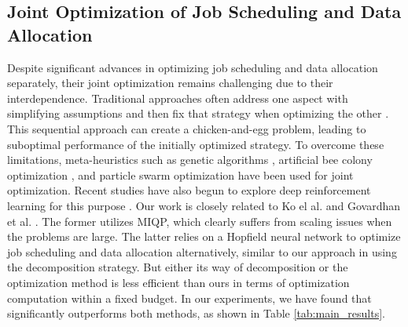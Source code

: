 \subsection{Joint Optimization of Job Scheduling and Data Allocation}
Despite significant advances in optimizing job scheduling and data allocation separately, their joint optimization remains challenging due to their interdependence. Traditional approaches often address one aspect with simplifying assumptions and then fix that strategy when optimizing the other \citep{CHANG2007846,7874167}. This sequential approach can create a chicken-and-egg problem, leading to suboptimal performance of the initially optimized strategy. To overcome these limitations, meta-heuristics such as genetic algorithms \citep{Phan05Co}, artificial bee colony optimization \citep{TAHERI20131564}, and particle swarm optimization \citep{liu2013swarm} have been used for joint optimization. Recent studies have also begun to explore deep reinforcement learning for this purpose \citep{wei2021joint1, wei2021joint2, ZENG2024121}. Our work is closely related to Ko el al. \citep{Ko2019MIQP} and Govardhan et al. \citep{TAHERI20131885}. The former utilizes MIQP, 
which clearly suffers from scaling issues when the problems are large. The latter relies on a Hopfield neural network to optimize job scheduling and data allocation alternatively, similar to our approach in using the decomposition strategy. But either its way of decomposition or the optimization method is less efficient than ours in terms of optimization computation within a fixed budget.  In our experiments, we have found that \name{} significantly outperforms both methods, as shown in Table \ref{tab:main_results}.
